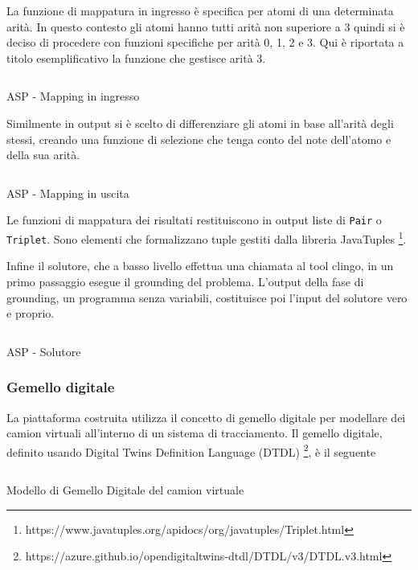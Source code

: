 \documentclass[a4paper,11pt]{article}
\newenvironment{longlisting}{\captionsetup{type=figure,labelformat=custom}}{}
\begin{document}
La funzione di mappatura in ingresso è specifica per atomi di una determinata arità. In questo contesto gli atomi hanno tutti arità non superiore a 3 quindi si è deciso di procedere con funzioni specifiche per arità 0, 1, 2 e 3. Qui è riportata a titolo esemplificativo la funzione che gestisce arità 3.

\begin{longlisting}
  \inputminted{java}{./code/asp.mapinput.java}
  \caption{ASP - Mapping in ingresso}
  \label{listing:asp3}
\end{longlisting}

Similmente in output si è scelto di differenziare gli atomi in base all'arità degli stessi, creando una funzione di selezione che tenga conto del note dell'atomo e della sua arità.

\begin{longlisting}
  \inputminted{java}{./code/asp.mapout.java}
  \caption{ASP - Mapping in uscita}
  \label{listing:asp4}
\end{longlisting}

Le funzioni di mappatura dei risultati restituiscono in output liste di \texttt{Pair} o \texttt{Triplet}. Sono elementi che formalizzano tuple gestiti dalla libreria JavaTuples \footnote{https://www.javatuples.org/apidocs/org/javatuples/Triplet.html}.

Infine il solutore, che a basso livello effettua una chiamata al tool clingo, in un primo passaggio esegue il grounding del problema. L'output della fase di grounding, un programma senza variabili, costituisce poi l'input del solutore vero e proprio.

\begin{longlisting}
  \inputminted{java}{./code/asp.solve.java}
  \caption{ASP - Solutore}
  \label{listing:asp5}
\end{longlisting}

\subsubsection{Gemello digitale}
La piattaforma costruita utilizza il concetto di gemello digitale per modellare dei camion virtuali all'interno di un sistema di tracciamento. Il gemello digitale, definito usando Digital Twins Definition Language (DTDL) \footnote{https://azure.github.io/opendigitaltwins-dtdl/DTDL/v3/DTDL.v3.html}, è il seguente

\begin{longlisting}
  \inputminted{json}{./code/Truck.json}
  \caption{Modello di Gemello Digitale del camion virtuale}
  \label{listing:dt0}
\end{longlisting}
\end{document}
